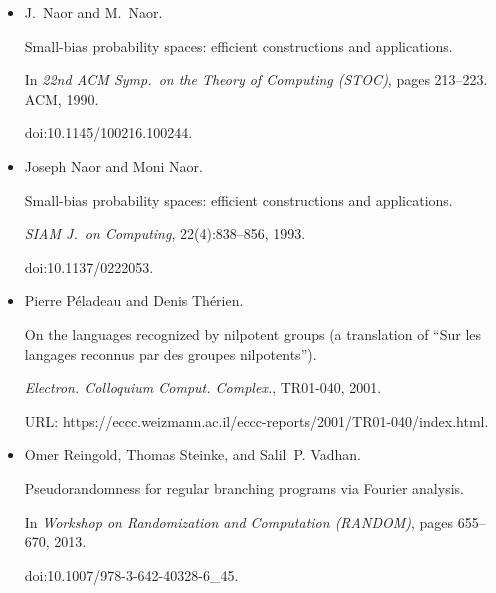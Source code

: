 \documentclass[10pt,a4paper]{article}
\begin{document}
\begin{itemize}
In \emph{Approximation, randomization, and combinatorial
optimization}, volume 5687 of \emph{Lecture Notes in Comput. Sci.}, pages
658–672. Springer, Berlin, 2009.


doi:10.1007/978-3-642-03685-9\_49.





\item[] 
[40]

J. Naor and M. Naor.


Small-bias probability spaces: efficient constructions and
applications.


In \emph{22nd ACM Symp. on the Theory of Computing (STOC)}, pages
213–223. ACM, 1990.


doi:10.1145/100216.100244.





\item[] 
[41]

Joseph Naor and Moni Naor.


Small-bias probability spaces: efficient constructions and
applications.


\emph{SIAM J. on Computing}, 22(4):838–856, 1993.


doi:10.1137/0222053.





\item[] 
[42]

Pierre Péladeau and Denis Thérien.


On the languages recognized by nilpotent groups (a translation of
“Sur les langages reconnus par des groupes nilpotents”).


\emph{Electron. Colloquium Comput. Complex.}, TR01-040, 2001.


URL:
https://eccc.weizmann.ac.il/eccc-reports/2001/TR01-040/index.html.





\item[] 
[43]

Omer Reingold, Thomas Steinke, and Salil P. Vadhan.


Pseudorandomness for regular branching programs via Fourier
analysis.


In \emph{Workshop on Randomization and Computation (RANDOM)}, pages
655–670, 2013.


doi:10.1007/978-3-642-40328-6\_45.






\end{itemize}
\end{document}
